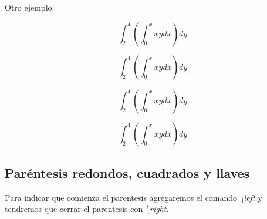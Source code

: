 \documentclass[graybox,envcountchap,sectrefs]{svmono}
\begin{document}
            Otro ejemplo:

            \begin{tcbraster}[raster columns=2, raster equal height]
                \begin{code}
                    \[
                    \int_2^4 (\int_0^x xy dx) dy
                     \]
                \end{code}
                \begin{compiled}
                    \[\int_2^4 (\int_0^x xy dx) dy \]
                \end{compiled}
            \end{tcbraster}

            \begin{tcbraster}[raster columns=2, raster equal height]
                \begin{code}
                    \[
                    \int_2^4 \left(\int_0^x xydx\right) dy
                    \]
                \end{code}
                \begin{compiled}
                    \[\int_2^4 \left(\int_0^x xy dx\right) dy \]
                \end{compiled}
            \end{tcbraster}

            \subsection{Paréntesis redondos, cuadrados y llaves}
            Para indicar que comienza el parentesis agregaremos el comando \emph{\textbackslash left} 
            y tendremos que cerrar el parentesis con \emph{\textbackslash right}.
\end{document}
